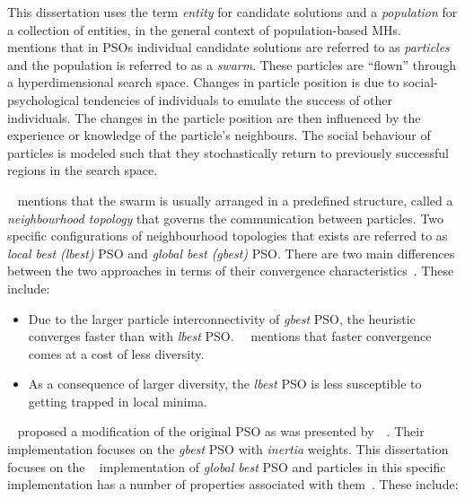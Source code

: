 This dissertation uses the term \textit{entity} for candidate solutions and a \textit{population} for a collection of entities, in the general context of population-based \acp{MH}.~\citeauthor{ref:engelbrecht:2007}~\cite{ref:engelbrecht:2007} mentions that in \acp{PSO} individual candidate solutions are referred to as \textit{particles} and the population is referred to as a \textit{swarm}. These particles are ``flown'' through a hyperdimensional search space. Changes in particle position is due to social-psychological tendencies of individuals to emulate the success of other individuals. The changes in the particle position are then influenced by the experience or knowledge of the particle's neighbours. The social behaviour of particles is modeled such that they stochastically return to previously successful regions in the search space.

\citeauthor{ref:vanwyk:2014}~\cite{ref:vanwyk:2014} mentions that the swarm is usually arranged in a predefined structure, called a \textit{neighbourhood topology} that governs the communication between particles. Two specific configurations of neighbourhood topologies that exists are referred to as \textit{local best (lbest)} \acs{PSO} and \textit{global best (gbest)} \acs{PSO}. There are two main differences between the two approaches in terms of their convergence characteristics~\cite{ref:eberhart:1996}. These include:

\begin{itemize}
      \item Due to the larger particle interconnectivity of \textit{gbest} \acs{PSO}, the heuristic converges faster than with \textit{lbest} \acs{PSO}.~\citeauthor{ref:engelbrecht:2007}~\cite{ref:engelbrecht:2007} mentions that faster convergence comes at a cost of less diversity.

      \item As a consequence of larger diversity, the \textit{lbest} \acs{PSO} is less susceptible to getting trapped in local minima.
\end{itemize}

\citeauthor{ref:shi:1998}~\cite{ref:shi:1998} proposed a modification of the original \acs{PSO} as was presented by~\citeauthor{ref:kennedy:1995}~\cite{ref:kennedy:1995}. Their implementation focuses on the \textit{gbest} \acs{PSO} with \textit{inertia} weights. This dissertation focuses on the \citeauthor{ref:shi:1998}~\cite{ref:shi:1998} implementation of \textit{global best} \acs{PSO} and particles in this specific implementation has a number of properties associated with them~\cite{ref:vanwyk:2014}. These include:

